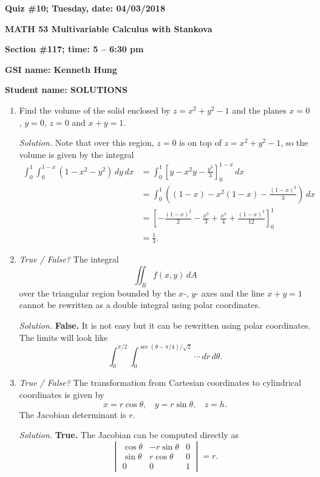 \documentclass{article}
\begin{document}
{\bf Quiz \#10; Tuesday, date: 04/03/2018}

{\bf MATH 53 Multivariable Calculus with Stankova}

{\bf Section \#117; time: 5 -- 6:30 pm}

{\bf GSI name: Kenneth Hung}

{\bf Student name: SOLUTIONS}

\vspace*{0.25in}

\begin{enumerate}
\item Find the volume of the solid enclosed by $z = x^2 + y^2 - 1$ and the planes $x = 0$, $y = 0$, $z = 0$ and $x + y = 1$.

{\em Solution.} Note that over this region, $z = 0$ is on top of $z = x^2 + y^2 - 1$, so the volume is given by the integral
\begin{align*}
\int_0^1 \int_0^{1-x} (1 - x^2 - y^2) \,dy \,dx & = \int_0^1 \left[y - x^2 y - \frac{y^3}{3}\right]_0^{1-x} \,dx \\
& = \int_0^1 \left((1-x) - x^2 (1-x) - \frac{(1-x)^3}{3}\right) \,dx \\
& = \left[-\frac{(1-x)^2}{2} - \frac{x^3}{3} + \frac{x^4}{4} + \frac{(1-x)^4}{12}\right]_0^1 \\
& = \frac{1}{3}.
\end{align*}

\item {\em True / False?} The integral
\[
\iint_R f(x, y) \,dA
\]
over the triangular region bounded by the $x$-, $y$- axes and the line $x + y = 1$ cannot be rewritten as a double integral using polar coordinates.

{\em Solution.} {\bf False.} It is not easy but it can be rewritten using polar coordinates. The limits will look like
\[
\int_0^{\pi / 2} \int_0^{\sec(\theta - \pi / 4) / \sqrt{2}} \cdots \,dr \,d\theta.
\]

\item {\em True / False?} The transformation from Cartesian coordinates to cylindrical coordinates is given by
\[
x = r \cos \theta, ~~~~ y = r \sin \theta, ~~~~ z = h.
\]
The Jacobian determinant is $r$.

{\em Solution.} {\bf True.} The Jacobian can be computed directly as
\[
\begin{vmatrix}
\cos \theta & -r \sin \theta & 0 \\
\sin \theta & r \cos \theta & 0 \\
0 & 0 & 1
\end{vmatrix} = r.
\]
\end{enumerate}
\end{document}
